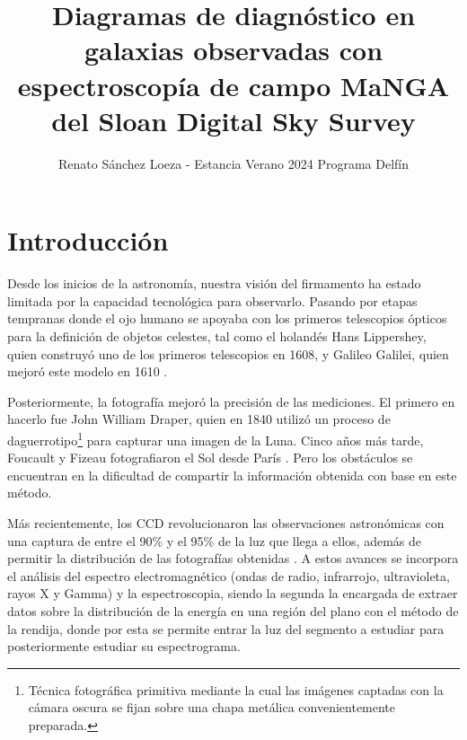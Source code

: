 \documentclass[10pt,twocolumn,a4paper]{opticajnl}
\title{Diagramas de diagnóstico en galaxias observadas con espectroscopía de campo MaNGA del Sloan Digital Sky Survey}
\author{Renato Sánchez Loeza - Estancia Verano 2024 Programa Delfín}
\begin{document}
\maketitle
\section*{Introducción}
Desde los inicios de la astronomía, nuestra visión del firmamento ha estado limitada por la capacidad tecnológica para observarlo. Pasando por etapas tempranas donde el ojo humano se apoyaba con los primeros telescopios ópticos para la definición de objetos celestes, tal como el holandés Hans Lippershey, quien construyó uno de los primeros telescopios en 1608, y Galileo Galilei, quien mejoró este modelo en 1610 \cite{cana-2015}.

Posteriormente, la fotografía mejoró la precisión de las mediciones. El primero en hacerlo fue John William Draper, quien en 1840 utilizó un proceso de daguerrotipo\footnote{Técnica fotográfica primitiva mediante la cual las imágenes captadas con la cámara oscura se fijan sobre una chapa metálica convenientemente preparada.} para capturar una imagen de la Luna. Cinco años más tarde, Foucault y Fizeau fotografiaron el Sol desde París \cite{olsen2021birth}. Pero los obstáculos se encuentran en la dificultad de compartir la información obtenida con base en este método.

Más recientemente, los CCD revolucionaron las observaciones astronómicas con una captura de entre el 90\% y el 95\% de la luz que llega a ellos, además de permitir la distribución de las fotografías obtenidas \cite{las-cumbres}. A estos avances se incorpora el análisis del espectro electromagnético (ondas de radio, infrarrojo, ultravioleta, rayos X y Gamma) y la espectroscopia, siendo la segunda la encargada de extraer datos sobre la distribución de la energía en una región del plano con el método de la rendija, donde por esta se permite entrar la luz del segmento a estudiar para posteriormente estudiar su espectrograma.
\end{document}
